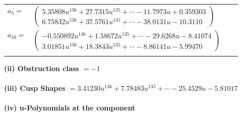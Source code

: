 \documentclass[1p]{elsarticle_modified}
\theoremstyle{definition}
\begin{document}
\begin{tabular}{m{7pt} m{180pt} m{7pt} m{180pt} }
\flushright $a_{5}=$&$\begin{pmatrix}5.35808 u^{136}+27.7315 u^{135}+\cdots-11.7973 u+0.359303\\6.75832 u^{136}+37.5761 u^{135}+\cdots-38.0131 u-10.3110\end{pmatrix}$ \\
\flushright $a_{10}=$&$\begin{pmatrix}-0.550892 u^{136}+1.58672 u^{135}+\cdots-29.6268 u-8.41074\\3.01851 u^{136}+18.3843 u^{135}+\cdots-8.86141 u-5.99470\end{pmatrix}$\\&\end{tabular}
\flushleft \textbf{(ii) Obstruction class $= -1$}\\~\\
\flushleft \textbf{(iii) Cusp Shapes $= 3.41230 u^{136}+7.78483 u^{135}+\cdots-25.4529 u-5.81017$}\\~\\
\newpage\renewcommand{\arraystretch}{1}
\flushleft \textbf{(iv) u-Polynomials at the component}\newline \\
\end{document}
